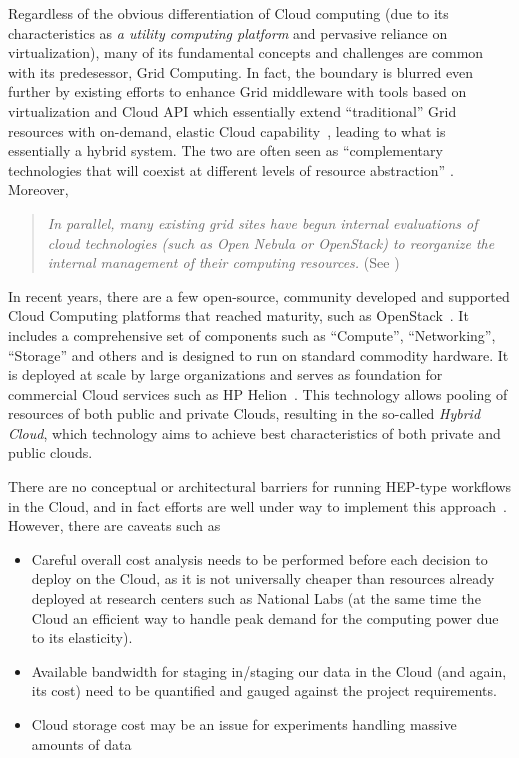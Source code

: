 Regardless of the obvious differentiation of Cloud computing (due to its characteristics as \textit{a utility computing platform} and pervasive reliance on virtualization),
many of its fundamental concepts and challenges are common with its predesessor, Grid Computing. In fact, the boundary is blurred even further by existing efforts to
enhance Grid middleware with tools based on virtualization and Cloud API which essentially extend ``traditional'' Grid resources with on-demand, elastic Cloud
capability~\cite{star_acat11}, leading to what is essentially a hybrid system. The two are often seen as ``complementary technologies that will coexist at
different levels of resource abstraction'' \cite{atlas_cloud_chep13}. Moreover,
\begin{quote}
\textit{In parallel, many existing grid sites have begun internal evaluations of cloud technologies (such as Open Nebula or OpenStack) to reorganize the internal management of their computing resources.}
(See \cite{atlas_cloud_chep12})
\end{quote}

In recent years, there are a few open-source, community developed and supported Cloud Computing platforms that reached maturity, such as OpenStack~\cite{openstack}.
It includes a comprehensive set of components such as ``Compute'', ``Networking'', ``Storage'' and others and is designed to run on standard commodity hardware.
It is deployed at scale by large organizations and serves as foundation for commercial Cloud services such as HP Helion~\cite{helion}. This technology allows pooling
of resources of both public and private Clouds, resulting in the so-called \textit{Hybrid Cloud}, which technology aims to achieve best characteristics of both private
and public clouds.

There are no conceptual or architectural barriers for running HEP-type workflows in the Cloud, and in fact efforts are well under way to implement this
approach~\cite{atlas_cloud_chep12}. However, there are caveats such as
\begin{itemize}
\item Careful overall cost analysis needs to be performed before each decision to deploy on the Cloud, as it is not universally cheaper than
resources already deployed at research centers such as National Labs (at the same time the Cloud an efficient way to handle peak demand
for the computing power due to its elasticity).
\item Available bandwidth for staging in/staging our data in the Cloud (and again, its cost) need to be quantified and gauged against the project requirements.
\item Cloud storage cost may be an issue for experiments handling massive amounts of data~\cite[p.~11]{atlas_cloud_chep12}
\end{itemize}


